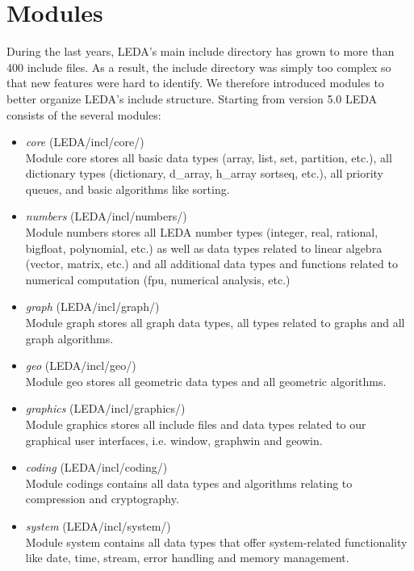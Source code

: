 \chapter{Modules} \label{modules}

During the last years, LEDA's main include directory has grown
to more than 400 include files. As a result, the include directory
was simply too complex so that new features were hard to identify. We therefore
introduced modules to better organize LEDA's include structure.
Starting from version 5.0 LEDA consists of the several modules:
\begin{itemize}
\item {\em core} (LEDA/incl/core/)\\
Module core stores all basic data types (array, list, set, partition, etc.),
all dictionary types (dictionary, d\_array, h\_array sortseq, etc.), all
priority queues, and basic algorithms like sorting. 

\item {\em numbers} (LEDA/incl/numbers/)\\
Module numbers stores all LEDA number types (integer, real, rational, bigfloat, polynomial, etc.)
as well as data types related to linear algebra (vector, matrix, etc.) and all additional
data types and functions related to numerical computation (fpu, numerical analysis, etc.)

\item {\em graph} (LEDA/incl/graph/)\\
Module graph stores all graph data types, all types related to graphs and all graph algorithms.

\item {\em geo} (LEDA/incl/geo/)\\
Module geo stores all geometric data types and all geometric algorithms.

\item {\em graphics} (LEDA/incl/graphics/)\\
Module graphics stores all include files and data types related to our graphical user 
interfaces, i.e. window, graphwin and geowin. 

\item {\em coding} (LEDA/incl/coding/)\\
Module codings contains all data types and algorithms relating to compression and 
cryptography.

\item {\em system} (LEDA/incl/system/)\\
Module system contains all data types that offer system-related functionality like
date, time, stream, error handling and memory management.


\end{itemize}
